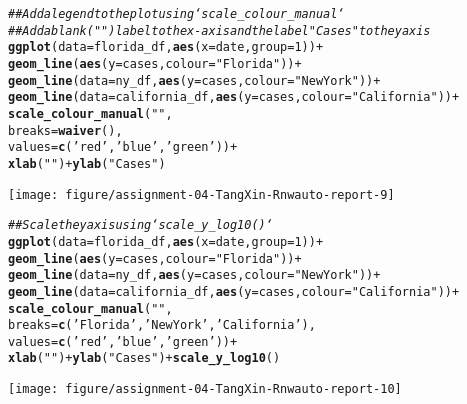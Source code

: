 \documentclass{article}\usepackage[]{graphicx}\usepackage[]{xcolor}
\makeatletter
\newcommand{\hlnum}[1]{\textcolor[rgb]{0.686,0.059,0.569}{#1}}%
\newcommand{\hlstr}[1]{\textcolor[rgb]{0.192,0.494,0.8}{#1}}%
\newcommand{\hlcom}[1]{\textcolor[rgb]{0.678,0.584,0.686}{\textit{#1}}}%
\newcommand{\hlopt}[1]{\textcolor[rgb]{0,0,0}{#1}}%
\newcommand{\hlstd}[1]{\textcolor[rgb]{0.345,0.345,0.345}{#1}}%
\newcommand{\hlkwc}[1]{\textcolor[rgb]{0.333,0.667,0.333}{#1}}%
\newcommand{\hlkwd}[1]{\textcolor[rgb]{0.737,0.353,0.396}{\textbf{#1}}}%
\newenvironment{kframe}{%
 \def\at@end@of@kframe{}%
 \ifinner\ifhmode%
  \def\at@end@of@kframe{\end{minipage}}%
  \begin{minipage}{\columnwidth}%
 \fi\fi%
 \def\FrameCommand##1{\hskip\@totalleftmargin \hskip-\fboxsep
 \colorbox{shadecolor}{##1}\hskip-\fboxsep
     \hskip-\linewidth \hskip-\@totalleftmargin \hskip\columnwidth}%
 \MakeFramed {\advance\hsize-\width
   \@totalleftmargin\z@ \linewidth\hsize
   \@setminipage}}%
 {\par\unskip\endMakeFramed%
 \at@end@of@kframe}
\newenvironment{knitrout}{}{} %
\makeatother
\begin{document}
\begin{knitrout}
\begin{kframe}\begin{alltt}
\hlcom{## Add a legend to the plot using `scale_colour_manual`}
\hlcom{## Add a blank (" ") label to the x-axis and the label "Cases" to the y axis}
\hlkwd{ggplot}\hlstd{(}\hlkwc{data}\hlstd{=florida_df,} \hlkwd{aes}\hlstd{(}\hlkwc{x}\hlstd{=date,} \hlkwc{group}\hlstd{=}\hlnum{1}\hlstd{))} \hlopt{+}
  \hlkwd{geom_line}\hlstd{(}\hlkwd{aes}\hlstd{(}\hlkwc{y} \hlstd{= cases,} \hlkwc{colour} \hlstd{=} \hlstr{"Florida"}\hlstd{))} \hlopt{+}
  \hlkwd{geom_line}\hlstd{(}\hlkwc{data}\hlstd{=ny_df,} \hlkwd{aes}\hlstd{(}\hlkwc{y} \hlstd{= cases,}\hlkwc{colour}\hlstd{=}\hlstr{"New York"}\hlstd{))} \hlopt{+}
  \hlkwd{geom_line}\hlstd{(}\hlkwc{data}\hlstd{=california_df,} \hlkwd{aes}\hlstd{(}\hlkwc{y} \hlstd{= cases,} \hlkwc{colour}\hlstd{=}\hlstr{"California"}\hlstd{))} \hlopt{+}
  \hlkwd{scale_colour_manual}\hlstd{(}\hlstr{""}\hlstd{,}
                      \hlkwc{breaks} \hlstd{=} \hlkwd{waiver}\hlstd{(),}
                      \hlkwc{values} \hlstd{=} \hlkwd{c}\hlstd{(}\hlstr{'red'}\hlstd{,} \hlstr{'blue'}\hlstd{,} \hlstr{'green'}\hlstd{))} \hlopt{+}
  \hlkwd{xlab}\hlstd{(}\hlstr{" "}\hlstd{)} \hlopt{+} \hlkwd{ylab}\hlstd{(}\hlstr{"Cases"}\hlstd{)}
\end{alltt}
\end{kframe}

{\centering \texttt{[image: figure/assignment-04-TangXin-Rnwauto-report-9]} 

}


\begin{kframe}\begin{alltt}
\hlcom{## Scale the y axis using `scale_y_log10()`}
\hlkwd{ggplot}\hlstd{(}\hlkwc{data}\hlstd{=florida_df,} \hlkwd{aes}\hlstd{(}\hlkwc{x}\hlstd{=date,} \hlkwc{group}\hlstd{=}\hlnum{1}\hlstd{))} \hlopt{+}
  \hlkwd{geom_line}\hlstd{(}\hlkwd{aes}\hlstd{(}\hlkwc{y} \hlstd{= cases,} \hlkwc{colour} \hlstd{=} \hlstr{"Florida"}\hlstd{))} \hlopt{+}
  \hlkwd{geom_line}\hlstd{(}\hlkwc{data}\hlstd{=ny_df,} \hlkwd{aes}\hlstd{(}\hlkwc{y} \hlstd{= cases,}\hlkwc{colour}\hlstd{=}\hlstr{"New York"}\hlstd{))} \hlopt{+}
  \hlkwd{geom_line}\hlstd{(}\hlkwc{data}\hlstd{=california_df,} \hlkwd{aes}\hlstd{(}\hlkwc{y} \hlstd{= cases,} \hlkwc{colour}\hlstd{=}\hlstr{"California"}\hlstd{))} \hlopt{+}
  \hlkwd{scale_colour_manual}\hlstd{(}\hlstr{""}\hlstd{,}
                      \hlkwc{breaks} \hlstd{=} \hlkwd{c}\hlstd{(}\hlstr{'Florida'}\hlstd{,} \hlstr{'New York'}\hlstd{,} \hlstr{'California'}\hlstd{),}
                      \hlkwc{values} \hlstd{=} \hlkwd{c}\hlstd{(}\hlstr{'red'}\hlstd{,} \hlstr{'blue'}\hlstd{,} \hlstr{'green'}\hlstd{))} \hlopt{+}
  \hlkwd{xlab}\hlstd{(}\hlstr{" "}\hlstd{)} \hlopt{+} \hlkwd{ylab}\hlstd{(}\hlstr{"Cases"}\hlstd{)} \hlopt{+} \hlkwd{scale_y_log10}\hlstd{()}
\end{alltt}
\end{kframe}

{\centering \texttt{[image: figure/assignment-04-TangXin-Rnwauto-report-10]} 

}


\end{knitrout}
\end{document}
